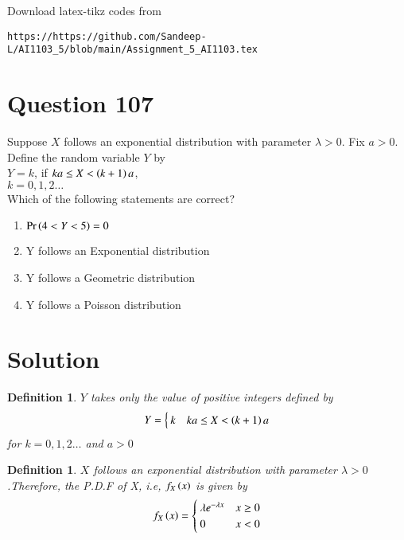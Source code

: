 \documentclass[journal,12pt,twocolumn]{IEEEtran}
\begin{document}
Download latex-tikz codes from 
%
\begin{lstlisting}
https://https://github.com/Sandeep-L/AI1103_5/blob/main/Assignment_5_AI1103.tex
\end{lstlisting}

\section*{Question 107}
Suppose $X$ follows an exponential distribution with parameter $\lambda>0$. Fix $a>0$. Define the random variable $Y$ by\\
$Y=k$, \qquad if $ka \leq X < \left(k+1\right)a$,\\
$k=0,1,2\ldots$\\
Which of the following statements are correct?
\begin{enumerate}
\setlength\itemsep{0.5em}
    \item $\Pr\left(4<Y<5\right)=0$
    \item Y follows an Exponential distribution
    \item Y follows a Geometric distribution
    \item Y follows a Poisson distribution
\end{enumerate}

\section*{Solution}

\newtheorem*{def_Y}{Definition}

\begin{def_Y}
$Y$ takes only the value of positive integers defined by
\begin{align}
Y=
    \begin{cases}
        k & ka \leq X < \left(k+1\right)a
    \end{cases}
\end{align}
for $k=0,1,2\ldots$ and $a>0$\\
\end{def_Y}

\newtheorem*{def_X}{Definition}

\begin{def_X}
    $X$ follows an exponential distribution with parameter $\lambda>0$.Therefore, the P.D.F of X, i.e, $f_X\left(x\right)$ is given by
    \begin{align}
    f_X\left(x\right) =
        \begin{cases}
        \lambda e^{-\lambda x} & x\geq 0 \\
        0 & x<0
        \end{cases}
    \end{align}
\end{def_X}
\end{document}
